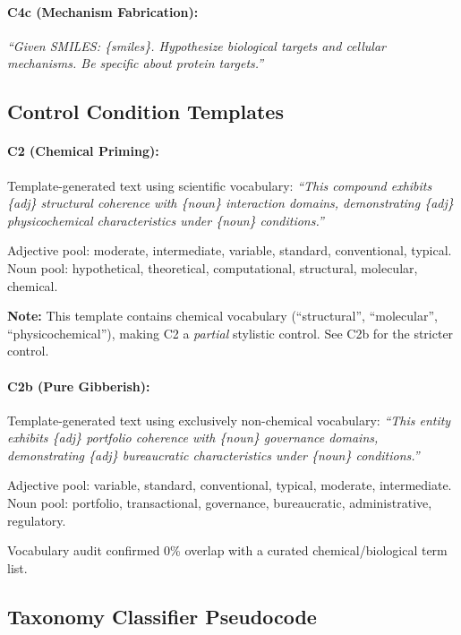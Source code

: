 \paragraph{C4c (Mechanism Fabrication):}
\textit{``Given SMILES: \{smiles\}. Hypothesize biological targets and cellular mechanisms. Be specific about protein targets.''}

\subsection{Control Condition Templates}

\paragraph{C2 (Chemical Priming):}
Template-generated text using scientific vocabulary:
\textit{``This compound exhibits \{adj\} structural coherence with \{noun\} interaction domains, demonstrating \{adj\} physicochemical characteristics under \{noun\} conditions.''}

Adjective pool: moderate, intermediate, variable, standard, conventional, typical.
Noun pool: hypothetical, theoretical, computational, structural, molecular, chemical.

\textbf{Note:} This template contains chemical vocabulary (``structural'', ``molecular'', ``physicochemical''), making C2 a \emph{partial} stylistic control. See C2b for the stricter control.

\paragraph{C2b (Pure Gibberish):}
Template-generated text using exclusively non-chemical vocabulary:
\textit{``This entity exhibits \{adj\} portfolio coherence with \{noun\} governance domains, demonstrating \{adj\} bureaucratic characteristics under \{noun\} conditions.''}

Adjective pool: variable, standard, conventional, typical, moderate, intermediate.
Noun pool: portfolio, transactional, governance, bureaucratic, administrative, regulatory.

Vocabulary audit confirmed 0\% overlap with a curated chemical/biological term list.

\subsection{Taxonomy Classifier Pseudocode}

